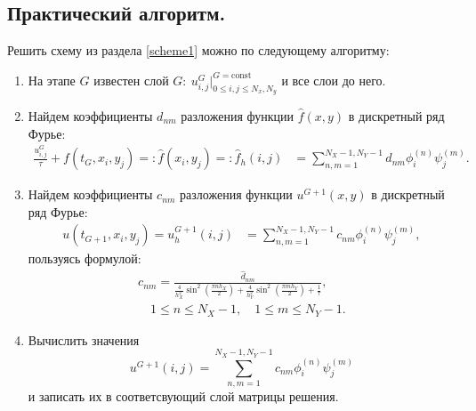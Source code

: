 \documentclass[14pt,a4paper]{extarticle}
\newcommand{\1}{\mathbbm{1}}
\begin{document}
\subsection{Практический алгоритм.}
Решить схему из раздела \ref{scheme1} можно по следующему алгоритму:
\begin{enumerate}
    \item На этапе $G$ известен слой $G: \ u_{i, j}^{G} \big|^{G = \text{const}} _{0 \leq i, j \leq N_x, N_y}$ и все слои до него.
    \item Найдем коэффициенты $d_{nm}$ разложения функции $\hat f(x, y)$ в дискретный ряд Фурье: 
    \begin{align*}
     \frac{u^{G}_{i, j}}{\tau} + f(t_G, x_i, y_j) =: \hat f(x_i, y_j) =: \hat f_h(i, j) &= \sum_{n, m = 1}^{N_X-1, N_Y-1} \hat d_{nm} \phi ^{(n)}_i \psi ^{(m)}_j.
    \end{align*}
    \item Найдем коэффициенты $c_{nm}$ разложения функции $u^{G+1}(x, y)$ в дискретный ряд Фурье: 
    \begin{align*}
    u(t_{G+1}, x_i, y_j) = u_h^{G+1}(i, j) &= \sum_{n, m = 1}^{N_X-1, N_Y-1} c_{nm} \phi ^{(n)}_i \psi ^{(m)}_j,
    \end{align*}
    пользуясь формулой:
    \begin{align*}
    c_{nm} = \frac{ \hat d_{nm}}{\frac{4}{h_X^2} \sin ^2\left(\frac{\pi n h_X}{2}\right)
    +  \frac{4}{h_Y^2} \sin ^2\left(\frac{\pi m h_Y}{2}\right) + \frac{1}{\tau}}, \\
    \quad 1 \leq n \leq N_X-1, \quad 1 \leq m \leq N_Y-1.
    \end{align*}
    \item Вычислить значения 
    $$
    u^{G+1}(i, j) = \sum_{n, m = 1}^{N_X-1, N_Y-1} c_{nm} \phi ^{(n)}_i \psi ^{(m)}_j
    $$ 
    и записать их в соответсвующий слой матрицы решения.
\end{enumerate}
\end{document}
